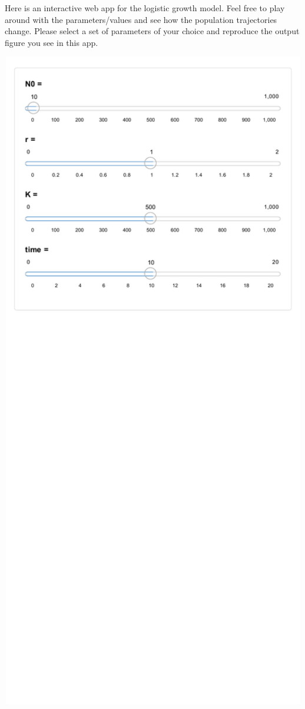 \documentclass[
]{book}
\begin{document}
Here is an interactive web app for the logistic growth model. Feel free to play around with the parameters/values and see how the population trajectories change. Please select a set of parameters of your choice and reproduce the output figure you see in this app.

\href{https://genchanghsu0115.shinyapps.io/Logistic_mod_shinyapp/}{\includegraphics[width=800px]{03_Week_3_files/figure-latex/unnamed-chunk-2-1} }
\end{document}

